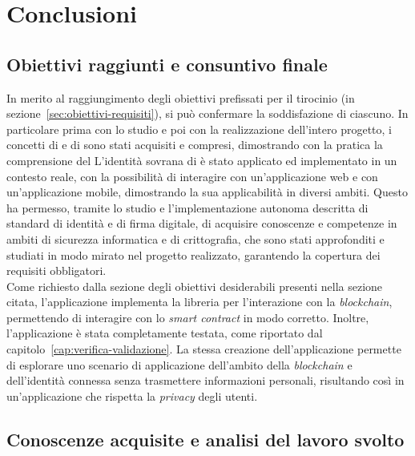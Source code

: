 \chapter{Conclusioni}\label{cap:conclusioni}


\section{Obiettivi raggiunti e consuntivo finale}\label{sec:conclusioni-obiettivi-consuntivo}

In merito al raggiungimento degli obiettivi prefissati per il tirocinio (in sezione~\ref{sec:obiettivi-requisiti}),
si può confermare la soddisfazione di ciascuno. In particolare prima con lo studio e poi con la realizzazione dell'intero progetto,
i concetti di  e di  sono stati acquisiti e compresi, dimostrando con la pratica la comprensione del
L'identità sovrana di  è stato applicato ed implementato in un contesto reale, con la possibilità di
interagire con un'applicazione web e con un'applicazione mobile, dimostrando la sua applicabilità in diversi ambiti.
Questo ha permesso, tramite lo studio e l'implementazione autonoma descritta di standard di identità e di firma digitale, di 
acquisire conoscenze e competenze in ambiti di sicurezza informatica e di crittografia, che sono stati approfonditi e studiati
in modo mirato nel progetto realizzato, garantendo la copertura dei requisiti obbligatori. \\

Come richiesto dalla sezione degli obiettivi desiderabili presenti nella sezione citata, l'applicazione implementa la libreria 
 per l'interazione con la \textit{blockchain}, permettendo di interagire con lo \textit{smart contract} in modo corretto.
Inoltre, l'applicazione è stata completamente testata, come riportato dal capitolo~\ref{cap:verifica-validazione}. 
La stessa creazione dell'applicazione permette di esplorare uno scenario di applicazione dell'ambito della \textit{blockchain} e dell'identità connessa
senza trasmettere informazioni personali, risultando così in un'applicazione che rispetta la \textit{privacy} degli utenti.

\section{Conoscenze acquisite e analisi del lavoro svolto}\label{sec:conclusioni-conoscenze-lavoro}

